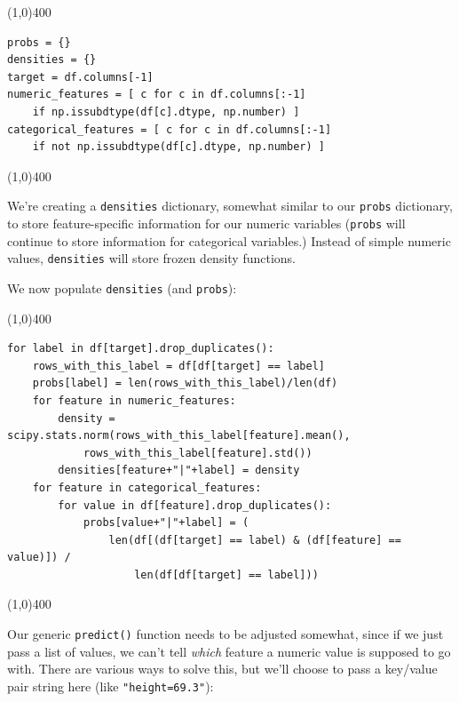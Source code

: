 \documentclass[12pt]{article}
\begin{document}
\begin{center}
\line(1,0){400}
\end{center}
\footnotesize
\begin{Verbatim}[fontsize=\small,samepage=true,frame=none]
probs = {}
densities = {}
target = df.columns[-1]
numeric_features = [ c for c in df.columns[:-1] 
    if np.issubdtype(df[c].dtype, np.number) ]
categorical_features = [ c for c in df.columns[:-1]
    if not np.issubdtype(df[c].dtype, np.number) ]
\end{Verbatim}
\begin{center}
\line(1,0){400}
\end{center}
\normalsize

We're creating a \texttt{densities} dictionary, somewhat similar to our
\texttt{probs} dictionary, to store feature-specific information for our
numeric variables (\texttt{probs} will continue to store information for
categorical variables.) Instead of simple numeric values, \texttt{densities}
will store frozen density functions.

We now populate \texttt{densities} (and \texttt{probs}):

\begin{center}
\line(1,0){400}
\end{center}
\footnotesize
\begin{Verbatim}[fontsize=\small,samepage=true,frame=none]
for label in df[target].drop_duplicates():
    rows_with_this_label = df[df[target] == label]
    probs[label] = len(rows_with_this_label)/len(df)
    for feature in numeric_features:
        density = scipy.stats.norm(rows_with_this_label[feature].mean(),
            rows_with_this_label[feature].std())
        densities[feature+"|"+label] = density
    for feature in categorical_features:
        for value in df[feature].drop_duplicates():
            probs[value+"|"+label] = (
                len(df[(df[target] == label) & (df[feature] == value)]) / 
                    len(df[df[target] == label]))
\end{Verbatim}
\normalsize
\begin{center}
\line(1,0){400}
\end{center}

Our generic \texttt{predict()} function needs to be adjusted somewhat, since
if we just pass a list of values, we can't tell \textit{which} feature a
numeric value is supposed to go with. There are various ways to solve this,
but we'll choose to pass a key/value pair string here (like
\texttt{"height=69.3"}):
\end{document}

